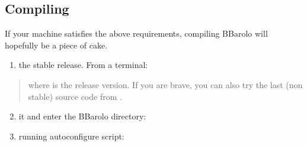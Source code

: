 \documentclass[letterpaper,10pt,english]{sphinxmanual}
\begin{document}
\subsection{Compiling}
\label{\detokenize{installing:id2}}\label{\detokenize{installing:compiling}}
If your machine satisfies the above requirements, compiling BBarolo will hopefully be a piece of cake.
\begin{enumerate}
\item {} 
 the  stable release. From a terminal:

\begin{sphinxVerbatim}[commandchars=\\\{\}]
   
\end{sphinxVerbatim}

\end{enumerate}
\begin{quote}

where  is the release version. If you are brave, you can also try the last (non stable) source code from .
\end{quote}
\begin{enumerate}
\setcounter{enumi}{1}
\item {} 
 it and enter the BBarolo directory:

\begin{sphinxVerbatim}[commandchars=\\\{\}]
   
  
\end{sphinxVerbatim}

\item {} 
 running autoconfigure script:

\begin{sphinxVerbatim}[commandchars=\\\{\}]
 
\end{sphinxVerbatim}

\end{enumerate}
\end{document}
